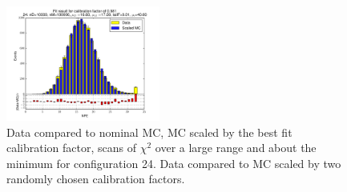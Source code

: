 \begin{figure}[htbp]
\begin{center}
\includegraphics[width=0.45\textwidth]{../FIGURES/24/FIG_Fit_result_for_calibration_factor_of_0_981.pdf} 
\caption{Data compared to nominal MC, MC scaled by the best fit calibration factor, scans of $\chi^2$ over a large range and about the minimum for configuration 24. Data compared to MC scaled by two randomly chosen calibration factors.} 
\label{tab:best_24} 
\end{center} \end{figure} 

